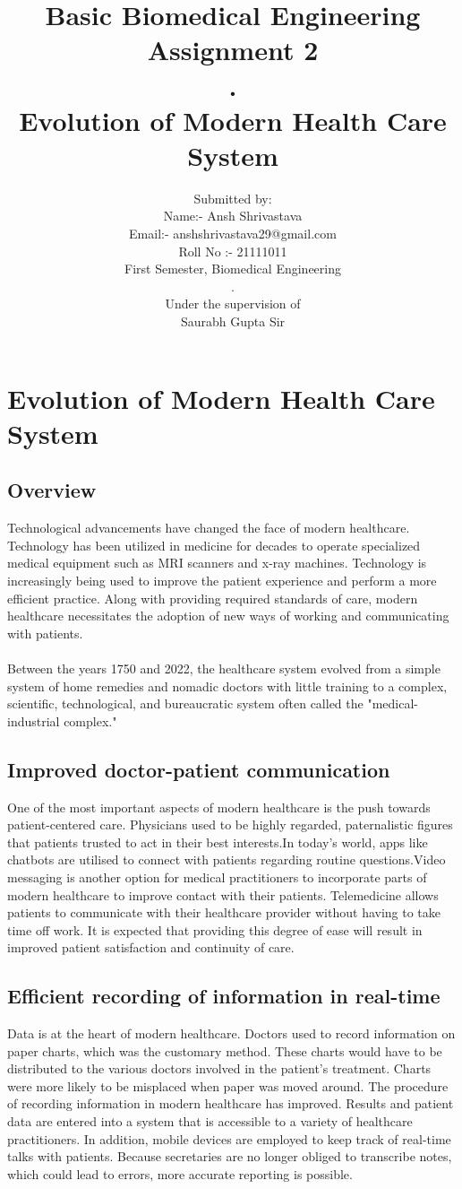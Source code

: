 \documentclass[12pt]{article}
\title{Basic Biomedical Engineering\\Assignment 2\\.\\Evolution of Modern Health Care System}
\author{Submitted by: \\Name:- Ansh Shrivastava\\Email:- anshshrivastava29@gmail.com\\Roll No :- 21111011\\First Semester, Biomedical Engineering\\.\\Under the supervision of\\Saurabh Gupta Sir}
\begin{document}
\maketitle
\clearpage
\tableofcontents
\clearpage

\section{Evolution of Modern Health Care System}
\subsection{Overview}
Technological advancements have changed the face of modern healthcare. Technology has been utilized in medicine for decades to operate specialized medical equipment such as MRI scanners and x-ray machines. Technology is increasingly being used to improve the patient experience and perform a more efficient practice. Along with providing required standards of care, modern healthcare necessitates the adoption of new ways of working and communicating with patients.
\\
\\
Between the years 1750 and 2022, the healthcare system evolved from a simple system of home remedies and nomadic doctors with little training to a complex, scientific, technological, and bureaucratic system often called the "medical-industrial complex."
\\
\subsection{Improved doctor-patient communication}
One of the most important aspects of modern healthcare is the push towards patient-centered care. Physicians used to be highly regarded, paternalistic figures that patients trusted to act in their best interests.In today's world, apps like chatbots are utilised to connect with patients regarding routine questions.Video messaging is another option for medical practitioners to incorporate parts of modern healthcare to improve contact with their patients. Telemedicine allows patients to communicate with their healthcare provider without having to take time off work. It is expected that providing this degree of ease will result in improved patient satisfaction and continuity of care.
\\
\subsection{Efficient recording of information in real-time}
Data is at the heart of modern healthcare. Doctors used to record information on paper charts, which was the customary method. These charts would have to be distributed to the various doctors involved in the patient's treatment. Charts were more likely to be misplaced when paper was moved around. The procedure of recording information in modern healthcare has improved. Results and patient data are entered into a system that is accessible to a variety of healthcare practitioners. In addition, mobile devices are employed to keep track of real-time talks with patients. Because secretaries are no longer obliged to transcribe notes, which could lead to errors, more accurate reporting is possible.
\\
\end{document}
